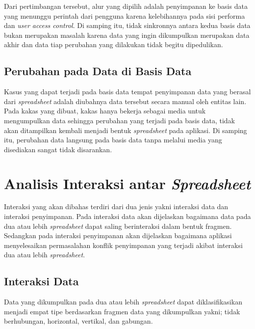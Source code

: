 	Dari pertimbangan tersebut, alur yang dipilih adalah penyimpanan ke basis data yang menunggu perintah dari pengguna karena kelebihannya pada sisi performa dan \textit{user access control}. Di samping itu, tidak sinkronnya antara kedua basis data bukan merupakan masalah karena data yang ingin dikumpulkan merupakan data akhir dan data tiap perubahan yang dilakukan tidak begitu dipedulikan.

	\subsection{Perubahan pada Data di Basis Data}
	Kasus yang dapat terjadi pada basis data tempat penyimpanan data yang berasal dari \textit{spreadsheet} adalah diubahnya data tersebut secara manual oleh entitas lain. Pada kakas yang dibuat, kakas hanya bekerja sebagai media untuk mengumpulkan data sehingga perubahan yang terjadi pada basis data, tidak akan ditampilkan kembali menjadi bentuk \textit{spreadsheet} pada aplikasi. Di samping itu, perubahan data langsung pada basis data tanpa melalui media yang disediakan sangat tidak disarankan.

\section{Analisis Interaksi antar \textit{Spreadsheet}}
Interaksi yang akan dibahas terdiri dari dua jenis yakni interaksi data dan interaksi penyimpanan. Pada interaksi data akan dijelaskan bagaimana data pada dua atau lebih \textit{spreadsheet} dapat saling berinteraksi dalam bentuk fragmen. Sedangkan pada interaksi penyimpanan akan dijelaskan bagaimana aplikasi menyelesaikan permasalahan konflik penyimpanan yang terjadi akibat interaksi dua atau lebih \textit{spreadsheet}.

\subsection{Interaksi Data}
Data yang dikumpulkan pada dua atau lebih \textit{spreadsheet} dapat diklasifikasikan menjadi empat tipe berdasarkan fragmen data yang dikumpulkan yakni; tidak berhubungan, horizontal, vertikal, dan gabungan.

